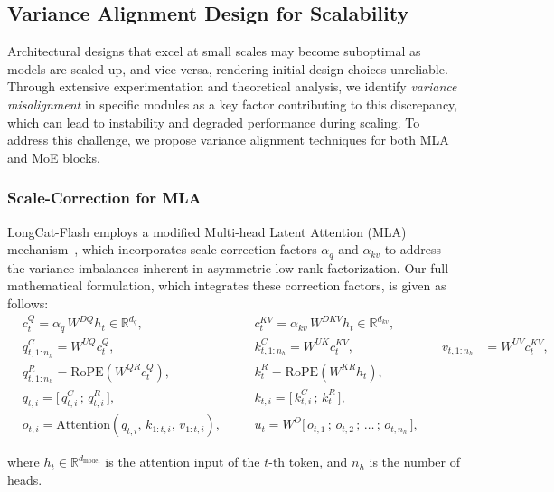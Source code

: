 \documentclass{article}
\newcommand{\longcat}{LongCat-Flash\xspace}
\begin{document}
\subsection{Variance Alignment Design for Scalability}
Architectural designs that excel at small scales may become suboptimal as models are scaled up, and vice versa, rendering initial design choices unreliable. Through extensive experimentation and theoretical analysis, we identify \textit{variance misalignment} in specific modules as a key factor contributing to this discrepancy, which can lead to instability and degraded performance during scaling. To address this challenge, we propose variance alignment techniques for both MLA and MoE blocks.

\subsubsection{Scale-Correction for MLA}
\label{sssec:mla_variance_alignment}
\longcat employs a modified Multi-head Latent Attention (MLA) mechanism~\citep{liu2024deepseek}, which incorporates scale-correction factors $\alpha_q$ and $\alpha_{kv}$ to address the variance imbalances inherent in asymmetric low-rank factorization. Our full mathematical formulation, which integrates these correction factors, is given as follows:
\begin{equation}
\begin{aligned}
    &c_t^Q   = \boxed{\alpha_q}\, W^{DQ} h_t \in \mathbb{R}^{d_q}, 
    &\quad &c_t^{KV} = \boxed{\alpha_{kv}}\, W^{DKV} h_t \in \mathbb{R}^{d_{kv}}, \\[0.8ex]
    &q_{t,1:n_h}^C = W^{UQ} c_t^Q, 
    &\quad &k_{t,1:n_h}^C = W^{UK} c_t^{KV}, 
    &\quad v_{t,1:n_h}   &= W^{UV} c_t^{KV}, \\[0.8ex]
    &q_{t,1:n_h}^R = \mathrm{RoPE}(W^{QR} c_t^Q), 
    &\quad &k_t^R     = \mathrm{RoPE}(W^{KR} h_t), \\[0.8ex]
    &q_{t,i}   = \big[\, q_{t,i}^C \,;\, q_{t,i}^R \,\big], 
    &\quad &k_{t,i}   = \big[\, k_{t,i}^C \,;\, k_t^R \,\big], \\[0.8ex]
    &o_{t,i} = \mathrm{Attention}\!\left(q_{t,i},\, k_{1:t,i},\, v_{1:t,i}\right), 
    &\quad &u_t = W^O \big[\, o_{t,1} \,;\, o_{t,2} \,;\, \dots \,;\, o_{t,n_h} \,\big],
\end{aligned}
\end{equation}


where $h_t \in \mathbb{R}^{d_{\text{model}}}$ is the attention input of the $t$-th token, and $n_h$ is the number of heads.
\end{document}
